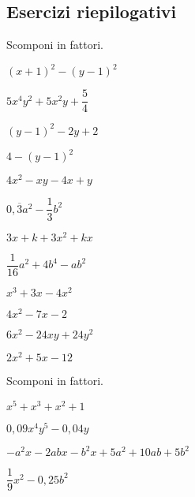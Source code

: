 \subsection{Esercizi riepilogativi}

\begin{esercizio}[*]
\label{ese:17.19}
Scomponi in fattori.
\begin{htmulticols}{2}
\begin{enumeratea}
\item \((x+1)^{2}-(y-1)^{2}\) 
\item \(5x^{4}y^{2}+5x^{2}y+\dfrac{5}{4}\) 
\item \((y-1)^{2}-2y+2\) 
\item \(4-(y-1)^{2}\) 
\item \(4x^{2}-xy-4x+y\) 
\item \(0,\overline{{3}}a^{2}-\dfrac{1}{3}b^{2}\) 
\item \(3x+k+3x^{2}+kx\) 
\item \(\dfrac{1}{16}a^{2}+4b^{4}-ab^{2}\)
\item \(x^{3}+3x-4x^{2}\) 
\item \(4x^{2}-7x-2\) 
\item \(6x^{2}-24xy+24y^{2}\) 
\item \(2x^{2}+5x-12\)
\end{enumeratea}
\end{htmulticols}
\end{esercizio}

\pagebreak %

\begin{esercizio}[*]
\label{ese:17.20}
Scomponi in fattori.
\begin{enumeratea}
\item \(x^{5}+x^{3}+x^{2}+1\)
\item \(0,09x^{4}y^{5}-0,04y\)
\item \(-a^{2}x-2{abx}-b^{2}x+5a^{2}+10{ab}+5b^{2}\)
\item \(\dfrac{1}{9}x^{2}-0,25b^{2}\)
\end{enumeratea}
\end{esercizio}

